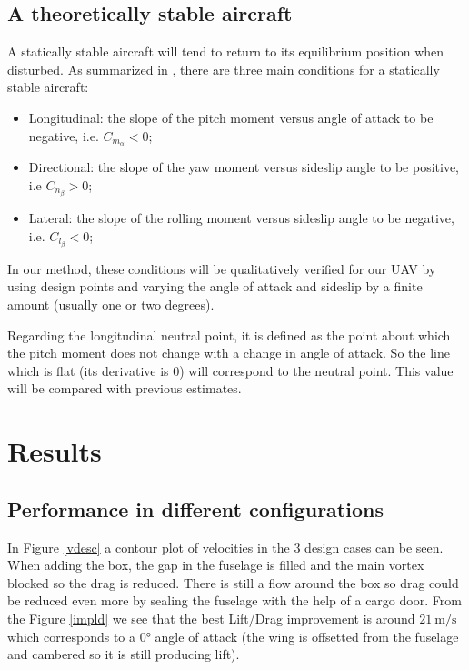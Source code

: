 \documentclass[11pt,a4paper,twoside,oneside]{article}
\begin{document}
\subsection{A theoretically stable aircraft}
A statically stable aircraft will tend to return to its equilibrium position when disturbed. As summarized in \cite{stabi}, there are three main conditions for a statically stable aircraft:
\begin{itemize} \setlength\itemsep{0em}
  \item[$-$] Longitudinal: the slope of the pitch moment versus angle of attack to be negative, i.e. $C_{m_\alpha}<0$;
  \item[$-$] Directional: the slope of the yaw moment versus sideslip angle to be positive, i.e $C_{n_\beta}>0$; 
  \item[$-$] Lateral: the slope of the rolling moment versus sideslip angle to be negative, i.e. $C_{l_\beta}<0$; 
\end{itemize}
In our method, these conditions will be qualitatively verified for our UAV by using design points and varying the angle of attack and sideslip by a finite amount (usually one or two degrees).

Regarding the longitudinal neutral point, it is defined as the point about which the pitch moment does not change with a change in angle of attack. So the line which is flat (its derivative is 0) will correspond to the neutral point. This value will be compared with previous estimates. 
 
 
\clearpage
\thispagestyle{plain}

\section{Results}

\subsection{Performance in different configurations}
In Figure \ref{vdesc} a contour plot of velocities in the 3 design cases can be seen. When adding the box, the gap in the fuselage is filled and the main vortex blocked so the drag is reduced. There is still a flow around the box so drag could be reduced even more by sealing the fuselage with the help of a cargo door. From the Figure \ref{impld} we see that the best Lift/Drag improvement is around $\SI{21}{\m\per\s}$ which corresponds to a \ang{0} angle of attack (the wing is offsetted from the fuselage and cambered so it is still producing lift). 
\end{document}
